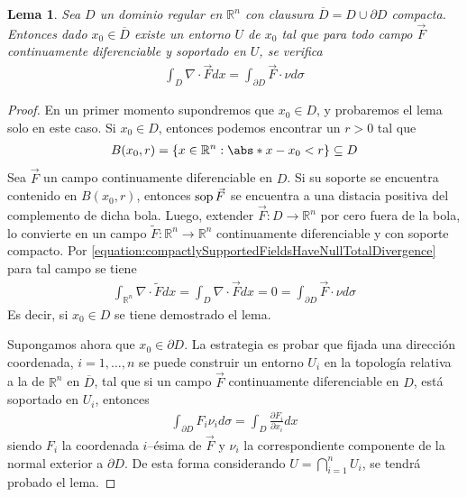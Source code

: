 \documentclass{report}
\newcommand{\realNumbers}{\mathbb{R}}
\newtheorem{lemma}{Lema}
\theoremstyle{definition}
\theoremstyle{remark}
\DeclareMathOperator{\support}{\textnormal{sop}}
\begin{document}
  \begin{lemma}
    \label{lemma:localDivergenceTheorem}
    Sea \(D\) un dominio regular en \(\realNumbers^n\) con clausura \(\overline{D} = D \cup \partial D\) compacta.
    Entonces dado \(x_0 \in \overline{D}\) existe un entorno \(U\) de \(x_0\) tal que para todo campo \(\vec{F}\) continuamente diferenciable y soportado en \(U\), se verifica
    \begin{align}
      \int_D \nabla \cdot \vec{F} d x
      =
      \int_{\partial D} \vec{F} \cdot \nu d \sigma
    \end{align}
  \end{lemma}
  \begin{proof}
    En un primer momento supondremos que \(x_0 \in D\), y probaremos el lema solo en este caso.
    Si \(x_0 \in D\), entonces podemos encontrar un \(r > 0\) tal que 
    \begin{align}
      B(x_0, r)
      =
      \{
        x \in \realNumbers^n : \abs*{x - x_0} < r
      \}
      \subseteq
      D
    \end{align}
    Sea \(\vec{F}\) un campo continuamente diferenciable en \(D\).
    Si su soporte se encuentra contenido en \(B(x_0, r)\), entonces \(\support \vec{F}\) se encuentra a una distacia positiva del complemento de dicha bola.
    Luego, extender \(\vec{F} : D \rightarrow \realNumbers^n\) por cero fuera de la bola, lo convierte en un campo \(\tilde{F} : \realNumbers^n \rightarrow \realNumbers^n\) continuamente diferenciable y con soporte compacto.
    Por \eqref{equation:compactlySupportedFieldsHaveNullTotalDivergence} para tal campo se tiene
    \begin{align}
      \int_{\realNumbers^n} \nabla \cdot \tilde{F} dx
      =
      \int_D \nabla \cdot \vec{F} dx
      =
      0
      =
      \int_{\partial D} \vec{F} \cdot \nu d \sigma
    \end{align}
    Es decir, si \(x_0 \in D\) se tiene demostrado el lema.

    Supongamos ahora que \(x_0 \in \partial D\).
    La estrategia es probar que fijada una dirección coordenada, \(i = 1, \dots, n\) se puede construir un entorno \(U_i\) en la topología relativa a la de \(\realNumbers^n\) en \(\overline{D}\), tal que si un campo \(\vec{F}\) continuamente diferenciable en \(D\), está soportado en \(U_i\), entonces
    \begin{align}
      \label{equation:divergenceTheoremInTheIthDirection}
      \int_{\partial D}
        F_i \nu_i
      d \sigma
      =
      \int_D
        \frac{\partial F_i}{\partial x_i}
      dx
    \end{align}
    siendo \(F_i\) la coordenada \(i\)--ésima de \(\vec{F}\) y \(\nu_i\) la correspondiente componente de la normal exterior a \(\partial D\).
    De esta forma considerando \(U = \bigcap_{i = 1}^n U_i\), se tendrá probado el lema.


\end{proof}
\end{document}

